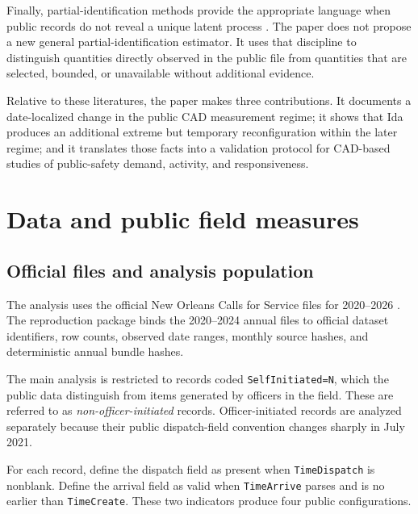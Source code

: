 \documentclass[11pt]{article}
\begin{document}
Finally, partial-identification methods provide the appropriate language when public records do not reveal a unique latent process \citep{Manski1989,Manski1990,Manski2003,Tamer2010,Molinari2020}. The paper does not propose a new general partial-identification estimator. It uses that discipline to distinguish quantities directly observed in the public file from quantities that are selected, bounded, or unavailable without additional evidence.

Relative to these literatures, the paper makes three contributions. It documents a date-localized change in the public CAD measurement regime; it shows that Ida produces an additional extreme but temporary reconfiguration within the later regime; and it translates those facts into a validation protocol for CAD-based studies of public-safety demand, activity, and responsiveness.

\section{Data and public field measures}

\subsection{Official files and analysis population}

The analysis uses the official New Orleans Calls for Service files for 2020--2026 \citep{DataNOLA2020,DataNOLA2021,DataNOLA2022,DataNOLA2023,DataNOLA2024,DataNOLA2025,DataNOLA2026}. The reproduction package binds the 2020--2024 annual files to official dataset identifiers, row counts, observed date ranges, monthly source hashes, and deterministic annual bundle hashes.

The main analysis is restricted to records coded \texttt{SelfInitiated=N}, which the public data distinguish from items generated by officers in the field. These are referred to as \emph{non-officer-initiated} records. Officer-initiated records are analyzed separately because their public dispatch-field convention changes sharply in July 2021.

For each record, define the dispatch field as present when \texttt{TimeDispatch} is nonblank. Define the arrival field as valid when \texttt{TimeArrive} parses and is no earlier than \texttt{TimeCreate}. These two indicators produce four public configurations.
\end{document}
